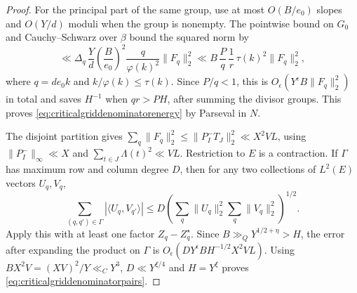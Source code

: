 \documentclass[11pt,a4paper]{article}
\numberwithin{equation}{section}
\begin{document}
\begin{proof}
For the principal part of the same group, use at most
$O(B/e_0)$ slopes and $O(Y/d)$ moduli when the group is
nonempty. The pointwise bound on $G_0$ and Cauchy--Schwarz
over $\beta$ bound the squared norm by
\[
 \ll \Delta_q\,\frac{Y}{d}
       \left(\frac{B}{e_0}\right)^2
       \frac{q}{\varphi(k)^2}\|F_q\|_2^2
 \ll B\,\frac{P}{q}\,\frac1r\,\tau(k)^2\|F_q\|_2^2 ,
\]
where $q=d e_0 k$ and $k/\varphi(k)\le\tau(k)$.
Since $P/q<1$, this is $O_\epsilon(Y^\epsilon B\|F_q\|_2^2)$
in total and saves $H^{-1}$ when $qr>PH$, after summing
the divisor groups. This proves
\cref{eq:criticalgriddenominatorenergy} by Parseval in $N$.

The disjoint partition gives
$\sum_q\|F_q\|_2^2\le\|P_I^-T_J\|_2^2\ll X^2VL$, using
$\|P_I^-\|_\infty\ll X$ and
$\sum_{t\in J}\Lambda(t)^2\ll VL$.
Restriction to $E$ is a contraction. If $\Gamma$ has maximum
row and column degree $D$, then for any two collections of
$L^2(E)$ vectors $U_q,V_q$,
\[
 \sum_{(q,q')\in\Gamma}|\langle U_q,V_{q'}\rangle|
 \le D\left(\sum_q\|U_q\|_2^2\sum_q\|V_q\|_2^2\right)^{1/2}.
\]
Apply this with at least one factor $Z_q-Z_q^\star$.
Since $B\gg_Q Y^{1/2+\eta}>H$, the error after expanding
the product on $\Gamma$ is
$O_\epsilon(DY^\epsilon B H^{-1/2}X^2VL)$.
Using $BX^2V=(XV)^2/Y\ll_C Y^3$, $D\ll Y^{\xi/4}$ and
$H=Y^\xi$ proves \cref{eq:criticalgriddenominatorpairs}.


\end{proof}
\end{document}
